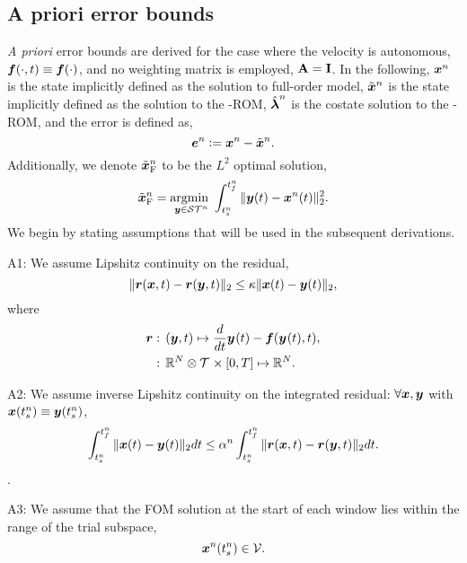 \subsection{A priori error bounds}
\textit{A priori} error bounds are derived for the case where the velocity is autonomous, $\boldsymbol f(\cdot,t) \equiv \boldsymbol f(\cdot)$, and no weighting matrix is employed, $\mathbf{A} = \mathbf{I}$. 
In the following,  ${\boldsymbol x}^{n}$ is the state implicitly defined as the solution to full-order model, $\tilde{\boldsymbol x}^{n}$ is the state implicitly defined as the solution to the \methodAcronym-ROM, $\hat{\boldsymbol \lambda}^{n}$ is the costate solution to the \methodAcronym-ROM, and the error is defined as,
$$\boldsymbol e^{n} \vcentcolon= {\boldsymbol x}^{n} - \tilde{\boldsymbol x}^{n}.$$
Additionally, we denote $\tilde{\boldsymbol x}_{\text{F}}^{n}$ to be the $L^2$ optimal solution,
$$\tilde{\boldsymbol x}_{\text{F}}^{n} = \underset{\boldsymbol y \in \mathcal{ ST }^n}{\text{argmin } } \int_{t_s^{n}}^{t_f^{n}} \|  \boldsymbol y(t) - {\boldsymbol x}^{n}(t)  \|_2^2.$$ 
We begin by stating assumptions that will be used in the subsequent derivations.

A1: We assume  Lipshitz continuity on the residual,
$$ \| \boldsymbol r(\boldsymbol x,t) - \boldsymbol r(\boldsymbol y,t)  \|_2 \le \kappa \| \boldsymbol x(t) - \boldsymbol y(t) \|_2,$$
where  
\begin{align*}
\boldsymbol r &: \, (\boldsymbol y,t) \mapsto \frac{d}{dt}\boldsymbol y^{}(t) - \boldsymbol f(\boldsymbol y^{}(t),t) ,\\
&: \, \mathbb{R}^{N} \otimes \mathcal{T}^{} \times [0,T] \mapsto \mathbb{R}^{N}.
\end{align*}

A2: We assume inverse Lipshitz continuity on the integrated residual: $\forall \boldsymbol x,\boldsymbol y$ with $\boldsymbol x(t_s^{n} ) \equiv \boldsymbol y(t_s^{n})$,
$$  \int_{t_s^{n}}^{t_f^{n}} \| \boldsymbol x(t) - \boldsymbol y(t) \|_2 dt \le  \alpha^{n} \int_{t_s^{n}}^{t_f^{n}} \| \boldsymbol r(\boldsymbol x,t) - \boldsymbol r(\boldsymbol y,t)  \|_2 dt.$$
.

A3: We assume that the FOM solution at the start of each window lies within the range of the trial subspace,
$$ {\boldsymbol x}^{n}(t_s^{n}) \in \mathcal{V }.$$ 
%

